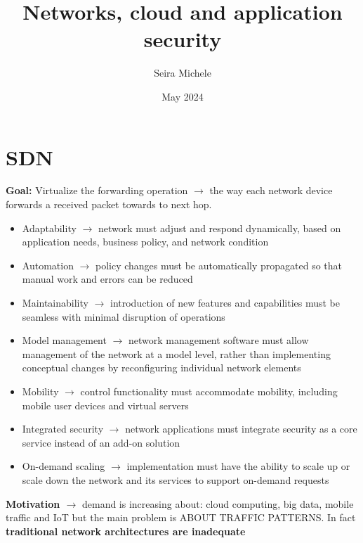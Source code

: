 \documentclass{article}
\title{Networks, cloud and application security}
\author{Seira Michele}
\date{May 2024}
\begin{document}
\maketitle
\tableofcontents
\newpage

\section{SDN}
\textbf{Goal:} Virtualize the forwarding operation $\rightarrow$ the way each network device forwards a received packet towards to next hop.
  \begin{itemize}
    \item Adaptability $\rightarrow$ network must adjust and respond dynamically, based on application needs, business policy, and network condition
    \item Automation $\rightarrow$ policy changes must be automatically propagated so that manual work and errors can be reduced
    \item Maintainability $\rightarrow$ introduction of new features and capabilities must be seamless with minimal disruption of operations
    \item Model management $\rightarrow$ network management software must allow management of the network at a model level, rather than implementing conceptual changes by reconfiguring individual network elements
    \item Mobility $\rightarrow$ control functionality must accommodate mobility, including mobile user devices and virtual servers
    \item Integrated security $\rightarrow$ network applications must integrate security as a core service instead of an add-on solution
    \item On-demand scaling $\rightarrow$ implementation must have the ability to scale up or scale down the network and its services to support on-demand requests
  \end{itemize}
\textbf{Motivation $\rightarrow$} demand is increasing about: cloud computing, big data, mobile traffic and IoT but the main problem is ABOUT TRAFFIC PATTERNS. In fact
\textbf{traditional network architectures are inadequate}
\end{document}
